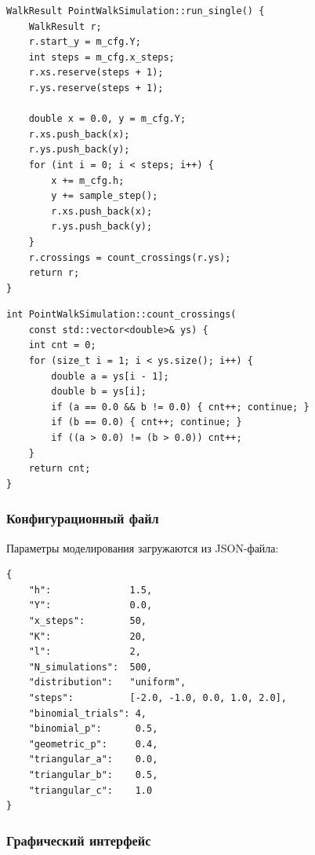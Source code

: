 \documentclass[14pt]{extarticle}
\begin{document}
\begin{listing}[htbp]
\caption{Метод генерации одной траектории}
\begin{verbatim}
WalkResult PointWalkSimulation::run_single() {
    WalkResult r;
    r.start_y = m_cfg.Y;
    int steps = m_cfg.x_steps;
    r.xs.reserve(steps + 1);
    r.ys.reserve(steps + 1);

    double x = 0.0, y = m_cfg.Y;
    r.xs.push_back(x);
    r.ys.push_back(y);
    for (int i = 0; i < steps; i++) {
        x += m_cfg.h;
        y += sample_step();
        r.xs.push_back(x);
        r.ys.push_back(y);
    }
    r.crossings = count_crossings(r.ys);
    return r;
}
\end{verbatim}
\end{listing}

\begin{listing}[htbp]
\caption{Подсчёт пересечений оси абсцисс}
\begin{verbatim}
int PointWalkSimulation::count_crossings(
    const std::vector<double>& ys) {
    int cnt = 0;
    for (size_t i = 1; i < ys.size(); i++) {
        double a = ys[i - 1];
        double b = ys[i];
        if (a == 0.0 && b != 0.0) { cnt++; continue; }
        if (b == 0.0) { cnt++; continue; }
        if ((a > 0.0) != (b > 0.0)) cnt++;
    }
    return cnt;
}
\end{verbatim}
\end{listing}
\subsubsection{Конфигурационный файл}
\label{sec:orgab5aeea}

Параметры моделирования загружаются из JSON-файла:

\begin{listing}[htbp]
\caption{Пример конфигурационного файла config.json}
\begin{verbatim}
{
    "h":              1.5,
    "Y":              0.0,
    "x_steps":        50,
    "K":              20,
    "l":              2,
    "N_simulations":  500,
    "distribution":   "uniform",
    "steps":          [-2.0, -1.0, 0.0, 1.0, 2.0],
    "binomial_trials": 4,
    "binomial_p":      0.5,
    "geometric_p":     0.4,
    "triangular_a":    0.0,
    "triangular_b":    0.5,
    "triangular_c":    1.0
}
\end{verbatim}
\end{listing}
\subsubsection{Графический интерфейс}
\label{sec:org3fb17bd}
\end{document}
